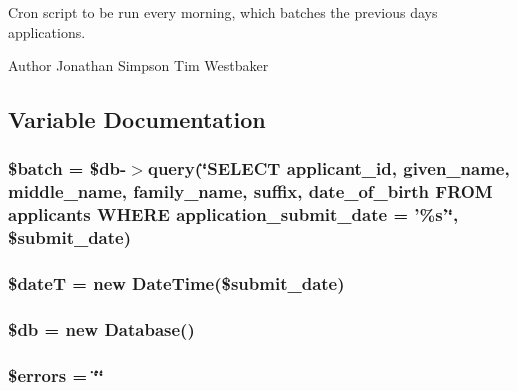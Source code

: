 Cron script to be run every morning, which batches the previous days applications.

\begin{DoxyAuthor}{Author}
Jonathan Simpson  Tim Westbaker 
\end{DoxyAuthor}


\subsection{Variable Documentation}
\hypertarget{cron_8php_a8dcc79b6d6f098ffd8ac189b35e7e784}{
\subsubsection[{\$batch}]{\setlength{\rightskip}{0pt plus 5cm}\$batch = \$db-\/$>$query(\char`\"{}S\-E\-L\-E\-C\-T applicant\-\_\-id, given\-\_\-name, middle\-\_\-name, family\-\_\-name, suffix, date\-\_\-of\-\_\-birth F\-R\-O\-M applicants W\-H\-E\-R\-E application\-\_\-submit\-\_\-date = '\%s'\char`\"{}, \$submit\-\_\-date)}}\label{cron_8php_a8dcc79b6d6f098ffd8ac189b35e7e784}
\hypertarget{cron_8php_a475580f5b4f47d0de53b8007d85280cb}{
\subsubsection[{\$date\-T}]{\setlength{\rightskip}{0pt plus 5cm}\$date\-T = new Date\-Time(\$submit\-\_\-date)}}\label{cron_8php_a475580f5b4f47d0de53b8007d85280cb}
\hypertarget{cron_8php_a1fa3127fc82f96b1436d871ef02be319}{
\subsubsection[{\$db}]{\setlength{\rightskip}{0pt plus 5cm}\$db = new Database()}}\label{cron_8php_a1fa3127fc82f96b1436d871ef02be319}
\hypertarget{cron_8php_ab24faf4aa647cdcee494fc48524ad4ff}{
\subsubsection[{\$errors}]{\setlength{\rightskip}{0pt plus 5cm}\$errors = \char`\"{}\char`\"{}}}\label{cron_8php_ab24faf4aa647cdcee494fc48524ad4ff}
